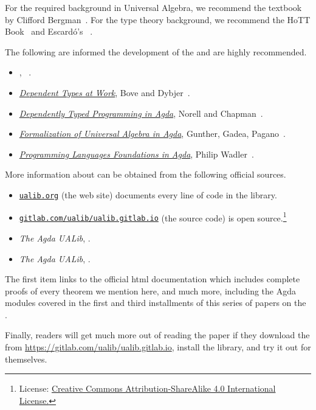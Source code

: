 For the required background in Universal Algebra, we recommend the textbook by Clifford Bergman~\cite{Bergman:2012}.  For the type theory background, we recommend the HoTT Book~\cite{HoTT} and Escard\'o's \ufcourse~\cite{MHE}.

The following are informed the development of the \ualib and are highly recommended.
\begin{itemize}
\item \textit{\ufcourse}, \escardo~\cite{MHE}.
\item \href{http://www.cse.chalmers.se/~peterd/papers/DependentTypesAtWork.pdf}{\it Dependent Types at Work}, Bove and Dybjer~\cite{Bove:2009}.
\item \href{http://www.cse.chalmers.se/~ulfn/papers/afp08/tutorial.pdf}{\it Dependently Typed Programming in Agda}, Norell and Chapman~\cite{Norell:2008}.
\item \href{http://www.sciencedirect.com/science/article/pii/S1571066118300768}{\it Formalization of Universal Algebra in Agda}, Gunther, Gadea, Pagano~\cite{Gunther:2018}.
\item \href{https://plfa.github.io/}{\it Programming Languages Foundations in Agda}, Philip Wadler~\cite{Wadler:2020}.
\end{itemize}

More information about \agdaualib can be obtained from the following official sources.
\begin{itemize}
  \item \href{https://ualib.gitlab.io}{\texttt{ualib.org}} (the web site) documents every line of code in the library.
  \item \href{https://gitlab.com/ualib/ualib.gitlab.io}{\texttt{gitlab.com/ualib/ualib.gitlab.io}} (the source code) \agdaualib is open source.\footnote{License: \href{https://creativecommons.org/licenses/by-sa/4.0/}{Creative Commons Attribution-ShareAlike 4.0 International License.}}
  \item \emph{The Agda UALib}, \otherparta.
  \item \emph{The Agda UALib}, \otherpartb.
\end{itemize}
The first item links to the official \ualib html documentation which includes complete proofs of every theorem we mention here, and much more, including the Agda modules covered in the first and third installments of this series of papers on the \ualib.

Finally, readers will get much more out of reading the paper if they download the \agdaualib from \url{https://gitlab.com/ualib/ualib.gitlab.io}, install the library, and try it out for themselves.
